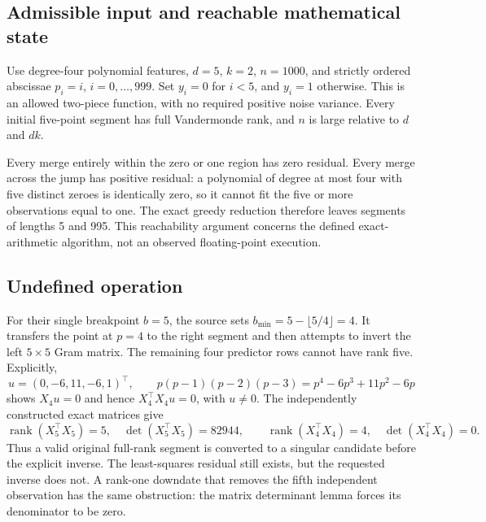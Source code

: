 \documentclass[10pt]{article}
\begin{document}
\subsection*{Admissible input and reachable mathematical state}
Use degree-four polynomial features, \(d=5\), \(k=2\), \(n=1000\), and strictly ordered abscissae \(p_i=i\), \(i=0,\ldots,999\). Set \(y_i=0\) for \(i<5\), and \(y_i=1\) otherwise. This is an allowed two-piece function, with no required positive noise variance. Every initial five-point segment has full Vandermonde rank, and \(n\) is large relative to \(d\) and \(dk\).\par
Every merge entirely within the zero or one region has zero residual. Every merge across the jump has positive residual: a polynomial of degree at most four with five distinct zeroes is identically zero, so it cannot fit the five or more observations equal to one. The exact greedy reduction therefore leaves segments of lengths 5 and 995. This reachability argument concerns the defined exact-arithmetic algorithm, not an observed floating-point execution.\par
\subsection*{Undefined operation}
For their single breakpoint \(b=5\), the source sets \(b_{\min}=5-\lfloor5/4\rfloor=4\). It transfers the point at \(p=4\) to the right segment and then attempts to invert the left \(5\times5\) Gram matrix. The remaining four predictor rows cannot have rank five. Explicitly, \[u=(0,-6,11,-6,1)^\top,\qquad
 p(p-1)(p-2)(p-3)=p^4-6p^3+11p^2-6p\] shows \(X_4u=0\) and hence \(X_4^\top X_4u=0\), with \(u\ne0\). The independently constructed exact matrices give \[\operatorname{rank}(X_5^\top X_5)=5,\quad
 \det(X_5^\top X_5)=82944,\qquad
 \operatorname{rank}(X_4^\top X_4)=4,\quad
 \det(X_4^\top X_4)=0 .\] Thus a valid original full-rank segment is converted to a singular candidate before the explicit inverse. The least-squares residual still exists, but the requested inverse does not. A rank-one downdate that removes the fifth independent observation has the same obstruction: the matrix determinant lemma forces its denominator to be zero.\par
\end{document}
